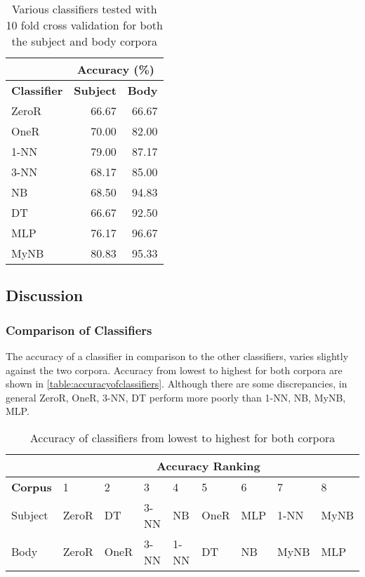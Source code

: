 \documentclass[10pt, a4paper]{article}
\begin{document}
\begin{table}[H]
\centering
\caption{Various classifiers tested with 10 fold cross validation for both the subject and body corpora}
\begin{tabular}{@{}lrr@{}}
\toprule
& \multicolumn{2}{c}{\textbf{Accuracy (\%)}} \\
\midrule
\textbf{Classifier} & \textbf{Subject} & \textbf{Body} \\
\midrule
ZeroR & 66.67 & 66.67 \\
OneR & 70.00 & 82.00 \\
1-NN & 79.00 & 87.17 \\
3-NN & 68.17 & 85.00 \\
NB & 68.50 & 94.83 \\
DT & 66.67 & 92.50 \\
MLP & 76.17 & 96.67 \\
MyNB & 80.83 & 95.33 \\
\bottomrule
\end{tabular}
\label{table:results}
\end{table}

\subsection{Discussion}

%

\subsubsection{Comparison of Classifiers}

The accuracy of a classifier in comparison to the other classifiers, varies slightly against the two corpora.  Accuracy from lowest to highest for both corpora are shown in \autoref{table:accuracyofclassifiers}. Although there are some discrepancies, in general ZeroR, OneR, 3-NN, DT perform more poorly than 1-NN, NB, MyNB, MLP. 

\begin{table}[H]
\centering
\caption{Accuracy of classifiers from lowest to highest for both corpora}
\begin{tabular}{@{} l llllllll @{}}
\toprule
& \multicolumn{8}{c}{\textbf{Accuracy Ranking}} \\
\midrule
\textbf{Corpus} & 1 & 2 & 3 & 4 & 5 & 6 & 7 & 8 \\
\midrule
Subject & ZeroR & DT & 3-NN & NB & OneR & MLP & 1-NN & MyNB\\
Body & ZeroR & OneR & 3-NN & 1-NN & DT & NB & MyNB & MLP\\
\bottomrule
\end{tabular}
\label{table:accuracyofclassifiers}
\end{table}
\end{document}
